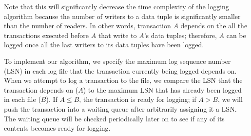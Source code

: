 Note that this will significantly decrease the time complexity of the logging algorithm because the number of writers to a data tuple is significantly smaller than the number of readers. In other words, transaction $A$ depends on the all the transactions executed before $A$ that write to $A$'s data tuples; therefore, $A$ can be logged once all the last writers to its data tuples have been logged. \par

To implement our algorithm, we specify the maximum log sequence number (LSN) in each log file that the transaction currently being logged depends on. When we attempt to log a transaction to the file, we compare the LSN that the transaction depends on ($A$) to the maximum LSN that has already been logged in each file ($B$). If $A\leq B$, the transaction is ready for logging; if $A>B$, we will push the transaction into a waiting queue after arbitrarily assigning it a LSN. The waiting queue will be checked periodically later on to see if any of its contents becomes ready for logging.\par

